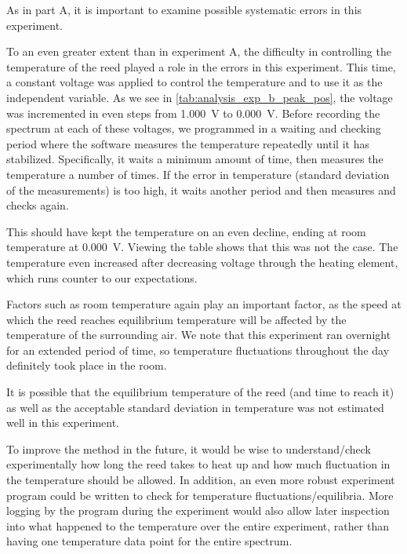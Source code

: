 As in part A, it is important to examine possible systematic errors in this experiment.

To an even greater extent than in experiment A, the difficulty in controlling the temperature of the reed played a role in the errors in this experiment.
This time, a constant voltage was applied to control the temperature and to use it as the independent variable.
As we see in \autoref{tab:analysis_exp_b_peak_pos}, the voltage was incremented in even steps from \qty{1.000}{\volt} to \qty{0.000}{\volt}.
Before recording the spectrum at each of these voltages, we programmed in a waiting and checking period where the software measures the temperature repeatedly until it has stabilized.
Specifically, it waits a minimum amount of time, then measures the temperature a number of times.
If the error in temperature (standard deviation of the measurements) is too high, it waits another period and then measures and checks again.

This should have kept the temperature on an even decline, ending at room temperature at \qty{0.000}{\volt}.
Viewing the table shows that this was not the case.
The temperature even increased after decreasing voltage through the heating element, which runs counter to our expectations.

Factors such as room temperature again play an important factor, as the speed at which the reed reaches equilibrium temperature will be affected by the temperature of the surrounding air.
We note that this experiment ran overnight for an extended period of time, so temperature fluctuations throughout the day definitely took place in the room.

It is possible that the equilibrium temperature of the reed (and time to reach it) as well as the acceptable standard deviation in temperature was not estimated well in this experiment.

To improve the method in the future, it would be wise to understand/check experimentally how long the reed takes to heat up and how much fluctuation in the temperature should be allowed.
In addition, an even more robust experiment program could be written to check for temperature fluctuations/equilibria.
More logging by the program during the experiment would also allow later inspection into what happened to the temperature over the entire experiment, rather than having one temperature data point for the entire spectrum.

